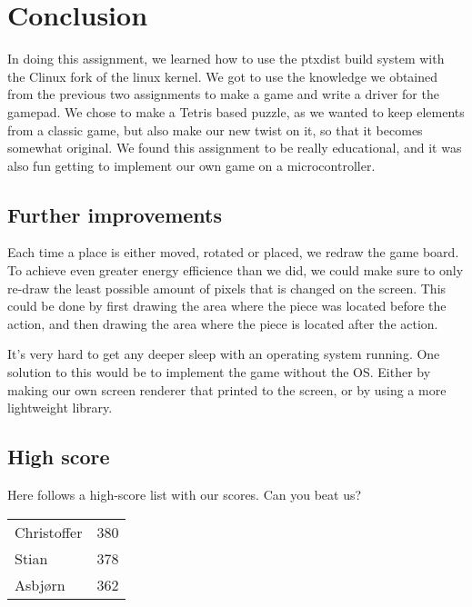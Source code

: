 \section{Conclusion}

In doing this assignment, we learned how to use the ptxdist build system with the \si{\micro}Clinux fork of the linux kernel.
We got to use the knowledge we obtained from the previous two assignments to make a game and write a driver for the gamepad.
We chose to make a Tetris based puzzle, as we wanted to keep elements from a classic game, but also make our new twist on it, so that it becomes somewhat original.
We found this assignment to be really educational, and it was also fun getting to implement our own game on a microcontroller.

\subsection{Further improvements}

Each time a place is either moved, rotated or placed, we redraw the game board.
To achieve even greater energy efficience than we did, we could make sure to only re-draw the least possible amount of pixels that is changed on the screen.
This could be done by first drawing the area where the piece was located before the action, and then drawing the area where the piece is located after the action.

It's very hard to get any deeper sleep with an operating system running.
One solution to this would be to implement the game without the OS.
Either by making our own screen renderer that printed to the screen, or by using a more lightweight library.

\subsection{High score}

Here follows a high-score list with our scores. Can you beat us?

\begin{table}[ht!]
        \begin{tabular}{ll}
                Christoffer & 380 \\
                Stian       & 378 \\
                Asbjørn     & 362 \\
                \end{tabular}
            \end{table}


